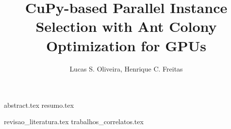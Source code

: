 \documentclass{article}
\title{CuPy-based Parallel Instance Selection with Ant Colony Optimization for GPUs}
\author{{Lucas S. Oliveira\inst{1}, Henrique C. Freitas\inst{1}}}
\begin{document}
 

\maketitle

{abstract.tex}
{resumo.tex}

{revisao_literatura.tex}
{trabalhos_correlatos.tex}

\printbibliography
\end{document}
